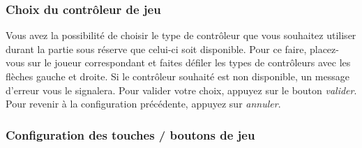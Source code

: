 
\subsubsection{Choix du contrôleur de jeu}

Vous avez la possibilité de choisir le type de contrôleur que vous souhaitez utiliser durant la partie sous réserve que celui-ci soit disponible. Pour ce faire, placez-vous sur le joueur correspondant et faites défiler les types de contrôleurs avec les flèches gauche et droite. Si le contrôleur souhaité est non disponible, un message d'erreur vous le signalera. Pour valider votre choix, appuyez sur le bouton \textit{valider}. Pour revenir à la configuration précédente, appuyez sur \textit{annuler}.

\subsubsection{Configuration des touches / boutons de jeu}

